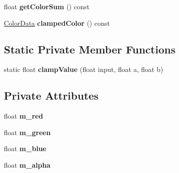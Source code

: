 \begin{DoxyCompactItemize}
\item 
float {\bfseries get\+Color\+Sum} () const \hypertarget{classColorData_a3f0f9e50c730eb653efd800070cf448c}{}\label{classColorData_a3f0f9e50c730eb653efd800070cf448c}

\item 
\hyperlink{classColorData}{Color\+Data} {\bfseries clamped\+Color} () const \hypertarget{classColorData_a5479f50514f714dc9c738a50b7b86365}{}\label{classColorData_a5479f50514f714dc9c738a50b7b86365}

\end{DoxyCompactItemize}
\subsection*{Static Private Member Functions}
\begin{DoxyCompactItemize}
\item 
static float {\bfseries clamp\+Value} (float input, float a, float b)\hypertarget{classColorData_a2e6ef72b4053a043ac66f3c53556b89c}{}\label{classColorData_a2e6ef72b4053a043ac66f3c53556b89c}

\end{DoxyCompactItemize}
\subsection*{Private Attributes}
\begin{DoxyCompactItemize}
\item 
float {\bfseries m\+\_\+red}\hypertarget{classColorData_ab085dd5021fee2698e03baf20d89bfc4}{}\label{classColorData_ab085dd5021fee2698e03baf20d89bfc4}

\item 
float {\bfseries m\+\_\+green}\hypertarget{classColorData_a594f89816d552a2cfcb91fe0ce8df2ce}{}\label{classColorData_a594f89816d552a2cfcb91fe0ce8df2ce}

\item 
float {\bfseries m\+\_\+blue}\hypertarget{classColorData_a811102de4cfed5429beedcc67714520f}{}\label{classColorData_a811102de4cfed5429beedcc67714520f}

\item 
float {\bfseries m\+\_\+alpha}\hypertarget{classColorData_ae8318f47f7ba2a9e2fd70b7dd03ef672}{}\label{classColorData_ae8318f47f7ba2a9e2fd70b7dd03ef672}

\end{DoxyCompactItemize}
